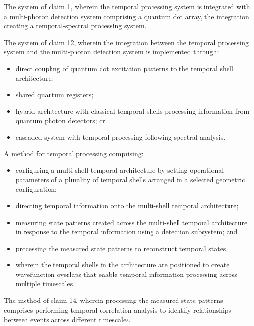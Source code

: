 \documentclass[12pt,letterpaper]{article}
\begin{document}
\begin{patentclaims}
    \item The system of claim 1, wherein the temporal processing system is integrated with a multi-photon detection system comprising a quantum dot array, the integration creating a temporal-spectral processing system.
    
    \item The system of claim 12, wherein the integration between the temporal processing system and the multi-photon detection system is implemented through:
    \begin{itemize}[leftmargin=2em]
        \item direct coupling of quantum dot excitation patterns to the temporal shell architecture;
        \item shared quantum registers;
        \item hybrid architecture with classical temporal shells processing information from quantum photon detectors; or
        \item cascaded system with temporal processing following spectral analysis.
    \end{itemize}
    
    \item A method for temporal processing comprising:
    \begin{itemize}[leftmargin=2em]
        \item configuring a multi-shell temporal architecture by setting operational parameters of a plurality of temporal shells arranged in a selected geometric configuration;
        \item directing temporal information onto the multi-shell temporal architecture;
        \item measuring state patterns created across the multi-shell temporal architecture in response to the temporal information using a detection subsystem; and
        \item processing the measured state patterns to reconstruct temporal states,
        \item wherein the temporal shells in the architecture are positioned to create wavefunction overlaps that enable temporal information processing across multiple timescales.
    \end{itemize}
    
    \item The method of claim 14, wherein processing the measured state patterns comprises performing temporal correlation analysis to identify relationships between events across different timescales.
    

\end{patentclaims}
\end{document}
